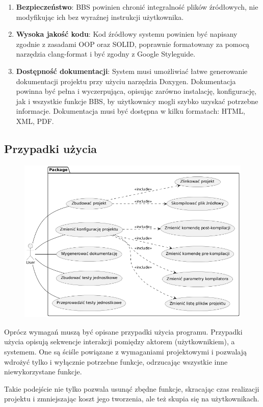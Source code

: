 \begin{enumerate}
    \item \textbf{Bezpieczeństwo}: BBS powinien chronić integralność plików źródłowych, nie modyfikując ich bez wyraźnej instrukcji użytkownika.
    \item \textbf{Wysoka jakość kodu}: Kod źródłowy systemu powinien być napisany zgodnie z zasadami OOP oraz SOLID, poprawnie formatowany za pomocą narzędzia clang-format i być zgodny z Google Styleguide.
    \item \textbf{Dostępność dokumentacji}: System musi umożliwiać łatwe generowanie dokumentacji projektu przy użyciu narzędzia Doxygen. Dokumentacja powinna być pełna i wyczerpująca, opisując zarówno instalację, konfigurację, jak i wszystkie funkcje BBS, by użytkownicy mogli szybko uzyskać potrzebne informacje. Dokumentacja musi być dostępna w kilku formatach: HTML, XML, PDF.
\end{enumerate}

\subsection{Przypadki użycia}
\begin{figure}[h]
\includegraphics[width=\textwidth]{Images/use-case.png}
\end{figure}

Oprócz wymagań muszą być opisane przypadki użycia programu. Przypadki użycia opisują sekwencje interakcji pomiędzy aktorem (użytkownikiem), a systemem. One są ściśle powiązane z wymaganiami projektowymi i pozwalają wdrożyć tylko i wyłącznie potrzebne funkcje, odrzucając wszystkie inne niewykorzystane funkcje.

Takie podejście nie tylko pozwala usunąć zbędne funkcje, skracając czas realizacji projektu i zmniejszając koszt jego tworzenia, ale też skupia się na użytkownikach.


